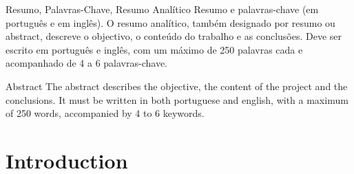 \documentclass[portuguese]{ist-thesis}
\begin{document}
\makecover

\begin{dedication}
	\lipsum[1] %
\end{dedication}

\begin{acknowledgements}
	\lipsum[2] %
\end{acknowledgements}

\begin{tabstract}{Resumo, Palavras-Chave, Resumo Analítico}
	Resumo e palavras-chave (em português e em inglês). O resumo analítico, também designado por resumo ou abstract, descreve o objectivo, o conteúdo do trabalho e as conclusões. Deve ser escrito em português e inglês, com um máximo de 250 palavras cada e acompanhado de 4 a 6 palavras-chave.
\end{tabstract}

\begin{fabstract}{Abstract}
	The abstract describes the objective, the content of the project and the conclusions. It must be written in both portuguese and english, with a maximum of 250 words, accompanied by 4 to 6 keywords.
\end{fabstract}

\tableofcontents

\listoffigures

\listoftables

\printunsrtglossary[style = long, nogroupskip]
\printunsrtglossary[type = abbreviations, style = long, nogroupskip, title = {Lista de Acrónimos}]
\printunsrtglossary[type = symbols, nogroupskip, title = {Lista de Símbolos}]

\mainstart

\chapter{Introduction}
\end{document}
